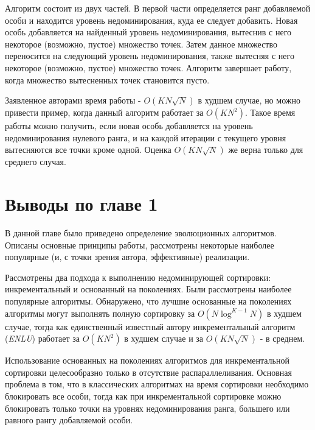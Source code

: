 Алгоритм состоит из двух частей. В первой части определяется ранг добавляемой особи и находится
уровень недоминирования, куда ее следует добавить. Новая особь добавляется на найденный уровень
недоминирования, вытеснив с него некоторое (возможно, пустое) множество точек. Затем данное множество
переносится на следующий уровень недоминирования, также вытесняя с него некоторое (возможно, пустое)
множество точек. Алгоритм завершает работу, когда множество вытесненных точек становится пусто.

Заявленное авторами время работы - $O(KN \sqrt{N})$ в худшем случае, но можно привести пример, когда данный
алгоритм работает за $O(KN^2)$. Такое время работы можно получить, если новая особь добавляется на 
уровень недоминирования нулевого ранга, и на каждой итерации с текущего уровня вытесняются все точки 
кроме одной. Оценка $O(KN \sqrt{N})$ же верна только для среднего случая.

\section{Выводы по главе 1}
В данной главе было приведено определение эволюционных алгоритмов. Описаны основные принципы работы,
рассмотрены некоторые наиболее популярные (и, с точки зрения автора, эффективные) реализации.

Рассмотрены два подхода к выполнению недоминирующей сортировки: инкрементальный и основанный на 
поколениях. Были рассмотрены наиболее популярные алгоритмы. Обнаружено, что лучшие основанные на
поколениях алгоритмы могут выполнять полную сортировку за $O(N \log^{K - 1} N)$ в худшем случае,
тогда как единственный известный автору инкрементальный алгоритм (\textit{ENLU}) работает за 
$O(KN^2)$ в худшем случае и за $O(KN \sqrt{N})$ - в среднем.

Использование основанных на поколениях алгоритмов для инкрементальной сортировки целесообразно только
в отсутствие распараллеливания. Основная проблема в том, что в классических алгоритмах на время 
сортировки необходимо блокировать все особи, тогда как при инкрементальной сортировке можно блокировать
только точки на уровнях недоминирования ранга, большего или равного рангу добавляемой особи.